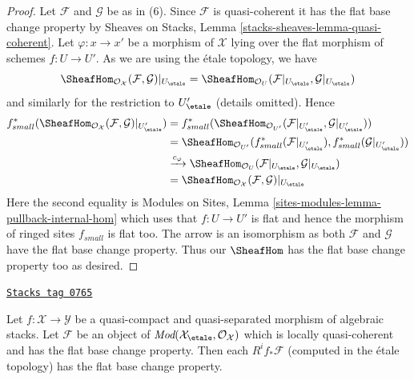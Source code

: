\begin{proof}
\medskip\noindent
Let $\mathcal{F}$ and $\mathcal{G}$ be as in (6). Since $\mathcal{F}$
is quasi-coherent it has the flat base change property by
Sheaves on Stacks, Lemma \ref{stacks-sheaves-lemma-quasi-coherent}.
Let $\varphi : x \to x'$ be a morphism of $\mathcal{X}$ lying
over the flat morphism of schemes $f : U \to U'$.
As we are using the \'etale topology, we have
$$
\SheafHom_{\mathcal{O}_\mathcal{X}}(\mathcal{F}, \mathcal{G})|_{U_\etale} =
\SheafHom_{\mathcal{O}_U}(\mathcal{F}|_{U_\etale}, \mathcal{G}|_{U_\etale})
$$
and similarly for the restriction to $U'_\etale$ (details omitted). Hence
\begin{align*}
f_{small}^*(
\SheafHom_{\mathcal{O}_\mathcal{X}}(\mathcal{F}, \mathcal{G})|_{U'_\etale})
& =
f_{small}^*(
\SheafHom_{\mathcal{O}_{U'}}(
\mathcal{F}|_{U'_\etale}, \mathcal{G}|_{U'_\etale})) \\
& =
\SheafHom_{\mathcal{O}_{U'}}(
f_{small}^*(\mathcal{F}|_{U'_\etale}),
f_{small}^*(\mathcal{G}|_{U'_\etale})) \\
& \xrightarrow{c_\varphi}
\SheafHom_{\mathcal{O}_U}(\mathcal{F}|_{U_\etale}, \mathcal{G}|_{U_\etale}) \\
& =
\SheafHom_{\mathcal{O}_\mathcal{X}}(\mathcal{F}, \mathcal{G})|_{U_\etale}
\end{align*}
Here the second equality is
Modules on Sites, Lemma \ref{sites-modules-lemma-pullback-internal-hom}
which uses that $f : U \to U'$ is flat and hence the morphism
of ringed sites $f_{small}$ is flat too.
The arrow is an isomorphism as both $\mathcal{F}$ and $\mathcal{G}$
have the flat base change property. Thus our $\SheafHom$
has the flat base change property too as desired.
\end{proof}

\begin{lemma}
\label{stacks-cohomology-lemma-flat-comparison}
\href{https://stacks.math.columbia.edu/tag/0765}{\texttt{Stacks tag 0765}}

Let $f : \mathcal{X} \to \mathcal{Y}$ be a quasi-compact and
quasi-separated morphism of algebraic stacks. Let
$\mathcal{F}$ be an object of
$\textit{Mod}(\mathcal{X}_\etale, \mathcal{O}_\mathcal{X})$
which is locally quasi-coherent and has the flat base change property.
Then each $R^if_*\mathcal{F}$ (computed in the \'etale topology)
has the flat base change property.
\end{lemma}

